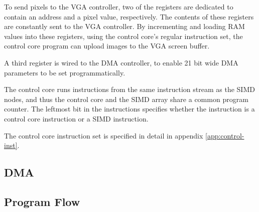 

To send pixels to the VGA controller, two of the registers are dedicated
to contain an address and a pixel value, respectively. The contents of
these registers are constantly sent to the VGA controller. By
incrementing and loading RAM values into these registers, using the
control core's regular instruction set, the control core program can
upload images to the VGA screen buffer.

A third register is wired to the DMA controller, to enable 21 bit wide
DMA parameters to be set programmatically.

The control core runs instructions from the same instruction stream as
the SIMD nodes, and thus the control core and the SIMD array share a
common program counter. The leftmost bit in the instructions specifies
whether the instruction is a control core instruction or a SIMD
instruction.

The control core instruction set is specified in detail in appendix
\ref{app:control-inst}.

\subsection{DMA}
\subsection{Program Flow}
